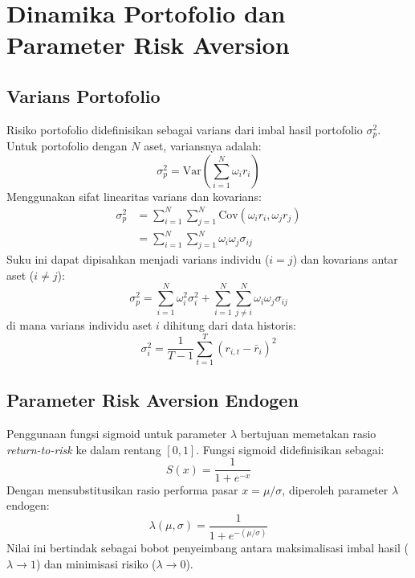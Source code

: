 \section{Dinamika Portofolio dan Parameter Risk Aversion}

\subsection{Varians Portofolio}
Risiko portofolio didefinisikan sebagai varians dari imbal hasil portofolio $\sigma_p^2$. Untuk portofolio dengan $N$ aset, variansnya adalah:
\begin{equation}
\sigma_p^2 = \text{Var}\left(\sum_{i=1}^N \omega_i r_i\right)
\end{equation}
Menggunakan sifat linearitas varians dan kovarians:
\begin{equation}
\begin{aligned}
\sigma_p^2 &= \sum_{i=1}^N \sum_{j=1}^N \text{Cov}(\omega_i r_i, \omega_j r_j) \\
&= \sum_{i=1}^N \sum_{j=1}^N \omega_i \omega_j \sigma_{ij}
\end{aligned}
\end{equation}
Suku ini dapat dipisahkan menjadi varians individu ($i=j$) dan kovarians antar aset ($i \neq j$):
\begin{equation}
\sigma_p^2 = \sum_{i=1}^N \omega_i^2 \sigma_i^2 + \sum_{i=1}^N \sum_{j \neq i}^N \omega_i \omega_j \sigma_{ij}
\end{equation}
di mana varians individu aset $i$ dihitung dari data historis:
\begin{equation}
\sigma_i^2 = \frac{1}{T-1} \sum_{t=1}^T (r_{i,t} - \bar{r}_i)^2
\end{equation}

\subsection{Parameter Risk Aversion Endogen}
Penggunaan fungsi sigmoid untuk parameter $\lambda$ bertujuan memetakan rasio \textit{return-to-risk} ke dalam rentang $[0, 1]$. Fungsi sigmoid didefinisikan sebagai:
\begin{equation}
S(x) = \frac{1}{1 + e^{-x}}
\end{equation}
Dengan mensubstitusikan rasio performa pasar $x = \mu/\sigma$, diperoleh parameter $\lambda$ endogen:
\begin{equation}
\lambda(\mu, \sigma) = \frac{1}{1 + e^{-(\mu/\sigma)}}
\end{equation}
Nilai ini bertindak sebagai bobot penyeimbang antara maksimalisasi imbal hasil ($\lambda \to 1$) dan minimisasi risiko ($\lambda \to 0$).
